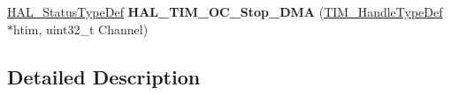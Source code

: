 \begin{DoxyCompactItemize}
\item 
\hyperlink{stm32f4xx__hal__def_8h_a63c0679d1cb8b8c684fbb0632743478f}{H\+A\+L\+\_\+\+Status\+Type\+Def} {\bfseries H\+A\+L\+\_\+\+T\+I\+M\+\_\+\+O\+C\+\_\+\+Stop\+\_\+\+D\+MA} (\hyperlink{struct_t_i_m___handle_type_def}{T\+I\+M\+\_\+\+Handle\+Type\+Def} $\ast$htim, uint32\+\_\+t Channel)\hypertarget{group___t_i_m___exported___functions___group2_ga27f1f66d2d38ec428580a5feb3628c48}{}\label{group___t_i_m___exported___functions___group2_ga27f1f66d2d38ec428580a5feb3628c48}

\end{DoxyCompactItemize}


\subsection{Detailed Description}
